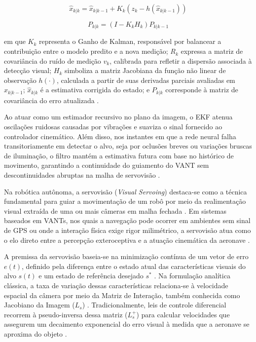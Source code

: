 \begin{equation}
\hat{x}_{k|k}
=
\hat{x}_{k|k-1}
+
K_k
\left(
z_k-h(\hat{x}_{k|k-1})
\right)
\label{eq:state_update}
\end{equation}

\begin{equation}
P_{k|k}
=
(I-K_kH_k)
P_{k|k-1}
\label{eq:covariance_update}
\end{equation}

\noindent em que $K_k$ representa o Ganho de Kalman, responsável por balancear a contribuição entre o modelo predito e a nova medição; $R_k$ expressa a matriz de covariância do ruído de medição $v_k$, calibrada para refletir a dispersão associada à detecção visual; $H_k$ simboliza a matriz Jacobiana da função não linear de observação $h(\cdot)$, calculada a partir de suas derivadas parciais avaliadas em $\hat{x}_{k|k-1}$; $\hat{x}_{k|k}$ é a estimativa corrigida do estado; e $P_{k|k}$ corresponde à matriz de covariância do erro atualizada \cite{kalman_beginners}.

Ao atuar como um estimador recursivo no plano da imagem, o EKF atenua oscilações ruidosas causadas por vibrações e suaviza o sinal fornecido ao controlador cinemático. Além disso, nos instantes em que a rede neural falha transitoriamente em detectar o alvo, seja por oclusões breves ou variações bruscas de iluminação, o filtro mantém a estimativa futura com base no histórico de movimento, garantindo a continuidade do guiamento do VANT sem descontinuidades abruptas na malha de servovisão \cite{barisic2019, vidal2007}.


Na robótica autônoma, a servovisão (\textit{Visual Servoing}) destaca-se como a técnica fundamental para guiar a movimentação de um robô por meio da realimentação visual extraída de uma ou mais câmeras em malha fechada \cite{thuilot2002}. Em sistemas baseados em VANTs, nos quais a navegação pode ocorrer em ambientes sem sinal de GPS ou onde a interação física exige rigor milimétrico, a servovisão atua como o elo direto entre a percepção exteroceptiva e a atuação cinemática da aeronave \cite{shang2016, lopezfranco2017}.

A premissa da servovisão baseia-se na minimização contínua de um vetor de erro $e(t)$, definido pela diferença entre o estado atual das características visuais do alvo $s(t)$ e um estado de referência desejado $s^{*}$ \cite{lopezfranco2017, pramono2025}. Na formulação analítica clássica, a taxa de variação dessas características relaciona-se à velocidade espacial da câmera por meio da Matriz de Interação, também conhecida como Jacobiano da Imagem ($L_s$) \cite{luo2020}. Tradicionalmente, leis de controle diferencial recorrem à pseudo-inversa dessa matriz ($L_s^{+}$) para calcular velocidades que assegurem um decaimento exponencial do erro visual à medida que a aeronave se aproxima do objeto \cite{lopezfranco2017, luo2020}.

